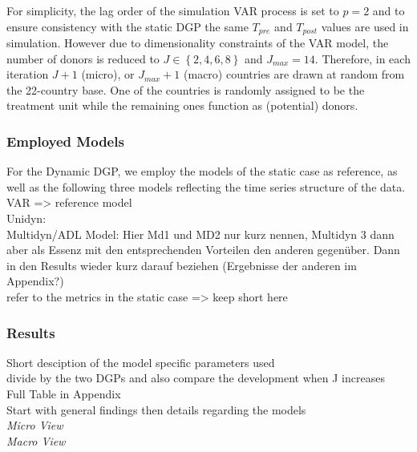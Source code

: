 For simplicity, the lag order of the simulation VAR process is set to $p=2$ and to ensure consistency with the static DGP the same $T_{pre}$ and $T_{post}$ values are used in simulation. However due to dimensionality constraints of the VAR model, the number of donors is reduced to $ J \in \left\lbrace 2,4,6,8\right\rbrace$ and $J_{max} = 14$. Therefore, in each iteration  $J+1$ (micro), or $J_{max}+1$ (macro) countries are drawn at random from the 22-country base. One of the countries is randomly assigned to be the treatment unit while the remaining ones function as (potential) donors.

\subsubsection{Employed Models}
For the Dynamic \ac{DGP}, we employ the models of the static case as reference, as well as the following three models reflecting the time series structure of the data. 
\\
VAR => reference model
\\
Unidyn:
\\
Multidyn/ADL Model: Hier Md1 und MD2 nur kurz nennen, Multidyn 3 dann aber als Essenz mit den entsprechenden Vorteilen den anderen gegenüber. Dann in den Results wieder kurz darauf beziehen (Ergebnisse der anderen im Appendix?)
\\
refer to the metrics in the static case => keep short here \\


\subsubsection{Results}
Short desciption of the model specific parameters used \\
divide by the two DGPs and also compare the development when J increases \\
Full Table in Appendix \\
Start with general findings then details regarding the models \\



\textit{Micro View} \\


\textit{Macro View} \\
